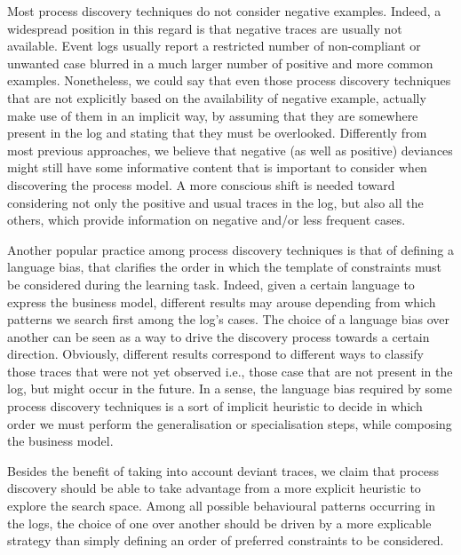 Most process discovery techniques do not consider negative examples. Indeed, a widespread position in this regard is that negative traces are usually not available. Event logs usually report a restricted number of non-compliant or unwanted case blurred in a much larger number of positive and more common examples. Nonetheless, we could say that even those process discovery techniques that are not explicitly based on the availability of negative example, actually make use of them in an implicit way, by assuming that they are somewhere present in the log and stating that they must be overlooked.
Differently from most previous approaches, we believe that negative (as well as positive) deviances might still have some informative content that is important to consider when discovering the process model. A more conscious shift is needed toward considering not only the positive and usual traces in the log, but also all the others, which provide information on negative and/or less frequent cases.

Another popular practice among process discovery techniques is that of defining a language bias, that clarifies the order in which the template of constraints must be considered during the learning task. Indeed, given a certain language to express the business model, different results may arouse depending from which patterns we search first among the log's cases. The choice of a language bias over another can be seen as a way to drive the discovery process towards a certain direction. Obviously, different results correspond to different ways to classify those traces that were not yet observed i.e., those case that are not present in the log, but might occur in the future.
In a sense, the language bias required by some process discovery techniques is a sort of implicit heuristic to decide in which order we must perform the generalisation or specialisation steps, while composing the business model.

Besides the benefit of taking into account deviant traces, we claim that process discovery should be able to take advantage from a more explicit heuristic to explore the search space. Among all possible behavioural patterns occurring in the logs, the choice of one over another should be driven by a more explicable strategy than simply defining an order of preferred constraints to be considered.
 

